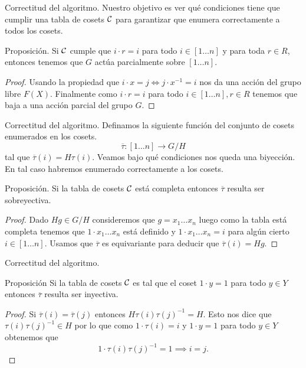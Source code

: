 \documentclass[aspectratio=169, 9pt]{beamer}
\newcommand{\In}{[1 \dots n]}
\newcommand{\ol}{\overline}
\newcommand{\Co}{{\cal{C}}}
\begin{document}
\begin{frame}[fragile]{Correctitud del algoritmo.}
	Nuestro objetivo es ver qué condiciones tiene que cumplir una tabla de cosets $\Co$ para garantizar que enumera correctamente a todos los cosets.
	\pause
	\begin{alertblock}{Proposición.}
		Si $\Co$ cumple que  $i \cdot r = i$ para todo $i \in \In$ y para toda $r \in R$, 
		entonces tenemos que $G$ actúa parcialmente sobre $\In$.
	\end{alertblock}
	\medskip
	\pause
	\begin{proof}
		Usando la propiedad que $i \cdot x = j \iff j\cdot x^{-1} = i$ nos da una acción del grupo libre $F(X)$.
		\pause
		Finalmente como $i \cdot r = i$ para todo $i \in \In, r \in R$ tenemos que baja a una acción parcial del grupo $G$. 
	\end{proof}
\end{frame}


\begin{frame}[fragile]{Correctitud del algoritmo.}
	Definamos la siguiente función del conjunto de cosets enumerados en los cosets.
	\[
	\ol \tau: \In \to G/H
	\]
	tal que $\ol \tau (i) = H \tau (i)$.
	\pause
	Veamos bajo qué condiciones nos queda una biyección. 
	En tal caso habremos enumerado correctamente a los cosets.
	\medskip
	
	
	
	\begin{alertblock}{Proposición.}
		Si la tabla de cosets $\Co$ está completa entonces $\ol \tau$ resulta ser sobreyectiva.
	\end{alertblock}
	\pause
	
	\begin{proof}
		Dado $Hg \in G/H$ consideremos que $g = x_1 \dots x_n$ \pause luego como la tabla está completa tenemos que $1 \cdot x_1 \dots x_n$ está definido y $1 \cdot x_1 \dots x_n  = i$ para algún cierto $i \in \In$.
		\pause
		Usamos que $\ol \tau$ es equivariante para deducir que $\ol \tau (i) = Hg$.
	\end{proof}
	
	
	
	
\end{frame}

\begin{frame}[fragile]{Correctitud del algoritmo.}
	\begin{alertblock}{Proposición}
		Si la tabla de cosets $\Co$ es tal que el coset $1 \cdot y = 1$ para todo $y \in Y$ entonces $\ol \tau$ resulta ser inyectiva.
	\end{alertblock}
	\pause
	\begin{proof}
		Si $\ol \tau (i) = \ol \tau (j)$ entonces $H \tau (i) \tau (j)^{-1} = H$.
		\pause
		Esto nos dice que $\tau (i) \tau(j)^{-1} \in H$ por lo que como $ 1 \cdot {\tau(i)} = i$ y  $1 \cdot y = 1$ para todo $y \in Y$ obtenemos que 
		\[
		1 \cdot \tau(i)\tau(j)^{-1} = 1 \implies i = j.
		\]   
	\end{proof}
\end{frame}
\end{document}
